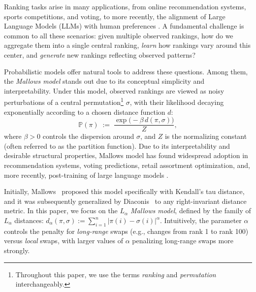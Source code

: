 \documentclass{article}
\renewcommand{\P}{\mathbb{P}}
\begin{document}
Ranking tasks arise in many applications, from online recommendation systems, sports competitions, and voting, to more recently, the alignment of Large Language Models (LLMs) with human preferences \cite{chen2024mallows, kleinberg2021algorithmic, rafailov2024direct}. 
A fundamental challenge is common to all these scenarios: given multiple observed rankings, how do we aggregate them into a single central ranking, \emph{learn} how rankings vary around this center, and \emph{generate} new rankings reflecting observed patterns?


Probabilistic models offer natural tools to address these questions.
Among them, the \textit{Mallows model}\cite{mallows1957non} stands out due to its conceptual simplicity and interpretability. 
Under this model, observed rankings are viewed as noisy perturbations of a central permutation\footnote{Throughout this paper, we use the terms \emph{ranking} and \emph{permutation} interchangeably.
} $\sigma$, with their likelihood decaying exponentially according to a chosen distance function $d$: 
\[
\P(\pi) \;:=\; \frac{\exp\!\bigl(-\beta\, d(\pi,\sigma)\bigr)}{Z},
\]
where \(\beta>0\) controls the dispersion around $\sigma$,  and \(Z\) is the normalizing constant (often referred to as the partition function). 
Due to its interpretability and desirable structural properties, Mallows model has found widespread adoption in recommendation systems, voting predictions, retail assortment optimization, and, more recently, post-training of large language models \cite{chen2024mallows,desir2016assortment,desir2021mallows,lebanon2007non}.

Initially, Mallows~\cite{mallows1957non} proposed this model specifically with Kendall's tau distance, and it was subsequently generalized by Diaconis~\cite{diaconis1988group} to any right-invariant distance metric. 
  In this paper, we focus on the \textit{$L_\alpha$ Mallows model}, defined by the family of $L_\alpha$ distances:
$d_\alpha(\pi, \sigma) := \sum_{i=1}^n |\pi(i) - \sigma(i)|^\alpha.$
Intuitively, the parameter \( \alpha \) controls
the penalty for \emph{long-range} swaps (e.g., changes from rank 1 to rank 100) versus \emph{local} swaps, with larger values of \( \alpha \) penalizing long-range swaps more strongly.
\end{document}

